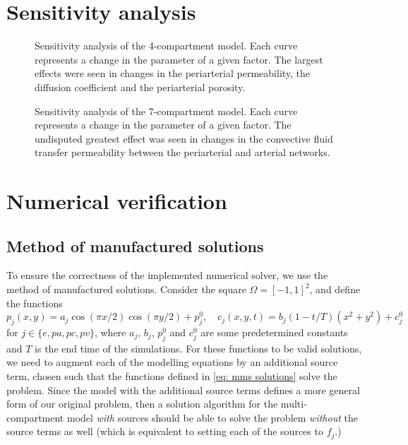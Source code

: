 \documentclass[a4paper,11pt]{article}
\newcommand{\1}{^{(1)}}
\newcommand{\2}{^{(2)}}
\begin{document}
\FloatBarrier
\section{Sensitivity analysis}
\begin{figure}[htbp]
    \centering
    \caption{Sensitivity analysis of the 4-compartment model. Each curve represents a change in the parameter of a given factor. The largest effects were seen in changes in the periarterial permeability, the diffusion coefficient and the periarterial porosity. }
    \label{fig:sensitivity4}
\end{figure}

\begin{figure}[htbp]
    \centering
    \caption{Sensitivity analysis of the 7-compartment model. Each curve represents a change in the parameter of a given factor. The undisputed greatest effect was seen in changes in the convective fluid transfer permeability between the periarterial and arterial networks.}
    \label{fig:sensitivity7}
\end{figure}

\FloatBarrier
\section{Numerical verification} \label{sec:numver}
\subsection{Method of manufactured solutions}
To ensure the correctness of the implemented numerical solver, we use the method of manufactured solutions. Consider the square $\Omega = [-1, 1]^2$, and define the functions
\begin{equation}
    p_j(x, y) = a_j \cos(\pi x/2)\cos(\pi y/2) + p_j^0, \quad c_j(x, y, t) = b_j (1 - t / T) (x^2 + y^2) + c_j^0
    \label{eq: mms solutions}
\end{equation}
for $j \in \{e, pa, pc, pv\}$, where $a_j, \, b_j$, $p_j^0$ and $c_j^0$ are some predetermined constants and $T$ is the end time of the simulations. For these functions to be valid solutions, we need to augment each of the modelling equations by an additional source term, chosen such that the functions defined in \eqref{eq: mms solutions} solve the problem. Since the model with the additional source terms defines a more general form of our original problem, then a solution algorithm for the multi-compartment model \textit{with} sources should be able to solve the problem \textit{without} the source terms as well (which is equivalent to setting each of the sources to $f_j$.)
\end{document}
